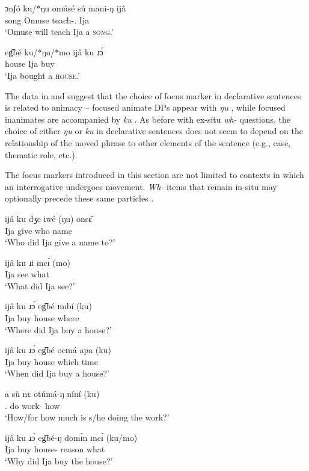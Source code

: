 \documentclass[output=paper,colorlinks,citecolor=brown
]{langscibook}
\begin{document}
\ea \label{ex:matte:14}
\begin{xlist}

\ex \label{ex:matte:14a}
\gll ɔnʃó ku/*ŋu omúsé sú mani-ŋ ijâ {\longrule}\\
song \Foc{} Omuse \Fut{} teach-\Tsg{}.\Acc{} Ija {}\\
\glt `Omuse will teach Ija a \textsc{song}.'

\ex \label{ex:matte:14b}
\gll eg͡bé ku/*ŋu/*mo ijâ ku ɹɔ́ {\longrule}\\
house \Foc{} Ija \Pfv{} buy {}\\
\glt `Ija bought a \textsc{house}.'

\end{xlist}
\z

\noindent The data in  and  suggest that the choice of focus marker in declarative sentences is related to animacy – focused animate DPs appear with \textit{ŋu} , while focused inanimates are accompanied by \textit{ku} . As before with ex-situ \textit{wh-} questions, the choice of either \textit{ŋu} or \textit{ku} in declarative sentences does not seem to depend on the relationship of the moved phrase to other elements of the sentence (e.g., case, thematic role, etc.).

The focus markers introduced in this section are not limited to contexts in which an interrogative undergoes movement. \textit{Wh-} items that remain in-situ may optionally precede these same particles . 

\ea \label{ex:matte:15}
\begin{xlist}

\ex \label{ex:matte:15a}
\gll ijâ ku dʒe iwé (ŋu) onsɛ̌\\
Ija \Pfv{} give who \Foc{} name\\
\glt `Who did Ija give a name to?'
 
\ex \label{ex:matte:15b}
\gll ijâ ku ɹi ɪncɪ́ (mo)\\
Ija \Pfv{} see what \Foc{}\\
\glt `What did Ija see?'

\ex \label{ex:matte:15c}
\gll ijâ ku ɹɔ́ eg͡bé ɪmbí (ku)\\
Ija \Pfv{} buy house where \Foc{}\\
\glt `Where did Ija buy a house?'

\ex \label{ex:matte:15d}
\gll ijâ ku ɹɔ́ eg͡bé ocɪná apa (ku)\\
Ija \Pfv{} buy house which time \Foc{}\\
\glt `When did Ija buy a house?'

\ex \label{ex:matte:15e}
\gll a sù nɛ otúmá-ŋ níní (ku)\\
\Tsg{}.\Nom{} \Prog{} do work-\Def{} how \Foc{}\\
\glt `How/for how much is s/he doing the work?'

\ex \label{ex:matte:15f}
\gll ijâ ku ɹɔ́ eg͡bé-ŋ domɪ́n ɪncɪ́ (ku/mo)\\
Ija \Pfv{} buy house-\Def{} reason what \Foc{}\\
\glt `Why did Ija buy the house?'

\end{xlist}
\z
\end{document}
